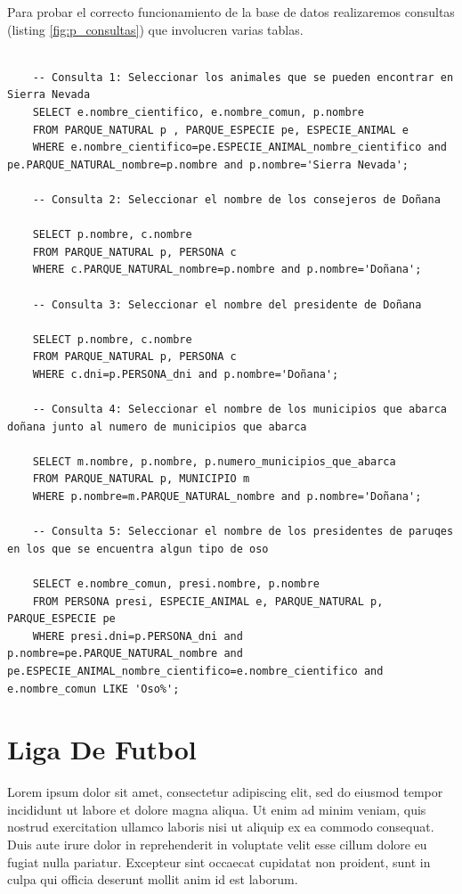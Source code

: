 \documentclass{article}
\begin{document}
Para probar el correcto funcionamiento de la base de datos realizaremos consultas (listing \ref{fig:p_consultas}) que involucren varias tablas.
\begin{lstlisting}[style=sqlstyle, label=fig:p_consultas,caption=Consultas Sobre Parques Naturales]
	
	-- Consulta 1: Seleccionar los animales que se pueden encontrar en Sierra Nevada
	SELECT e.nombre_cientifico, e.nombre_comun, p.nombre
	FROM PARQUE_NATURAL p , PARQUE_ESPECIE pe, ESPECIE_ANIMAL e
	WHERE e.nombre_cientifico=pe.ESPECIE_ANIMAL_nombre_cientifico and pe.PARQUE_NATURAL_nombre=p.nombre and p.nombre='Sierra Nevada';
	
	-- Consulta 2: Seleccionar el nombre de los consejeros de Doñana
	
	SELECT p.nombre, c.nombre
	FROM PARQUE_NATURAL p, PERSONA c
	WHERE c.PARQUE_NATURAL_nombre=p.nombre and p.nombre='Doñana';
	
	-- Consulta 3: Seleccionar el nombre del presidente de Doñana
	
	SELECT p.nombre, c.nombre
	FROM PARQUE_NATURAL p, PERSONA c
	WHERE c.dni=p.PERSONA_dni and p.nombre='Doñana';
	
	-- Consulta 4: Seleccionar el nombre de los municipios que abarca doñana junto al numero de municipios que abarca
	
	SELECT m.nombre, p.nombre, p.numero_municipios_que_abarca
	FROM PARQUE_NATURAL p, MUNICIPIO m
	WHERE p.nombre=m.PARQUE_NATURAL_nombre and p.nombre='Doñana';
	
	-- Consulta 5: Seleccionar el nombre de los presidentes de paruqes en los que se encuentra algun tipo de oso
	
	SELECT e.nombre_comun, presi.nombre, p.nombre
	FROM PERSONA presi, ESPECIE_ANIMAL e, PARQUE_NATURAL p, PARQUE_ESPECIE pe
	WHERE presi.dni=p.PERSONA_dni and p.nombre=pe.PARQUE_NATURAL_nombre and pe.ESPECIE_ANIMAL_nombre_cientifico=e.nombre_cientifico and e.nombre_comun LIKE 'Oso%';
  \end{lstlisting}

\newpage
\section{Liga De Futbol}

Lorem ipsum dolor sit amet, consectetur adipiscing elit, sed do eiusmod tempor incididunt ut labore et dolore magna aliqua. Ut enim ad minim veniam, quis nostrud exercitation ullamco laboris nisi ut aliquip ex ea commodo consequat. Duis aute irure dolor in reprehenderit in voluptate velit esse cillum dolore eu fugiat nulla pariatur. Excepteur sint occaecat cupidatat non proident, sunt in culpa qui officia deserunt mollit anim id est laborum.
\end{document}
